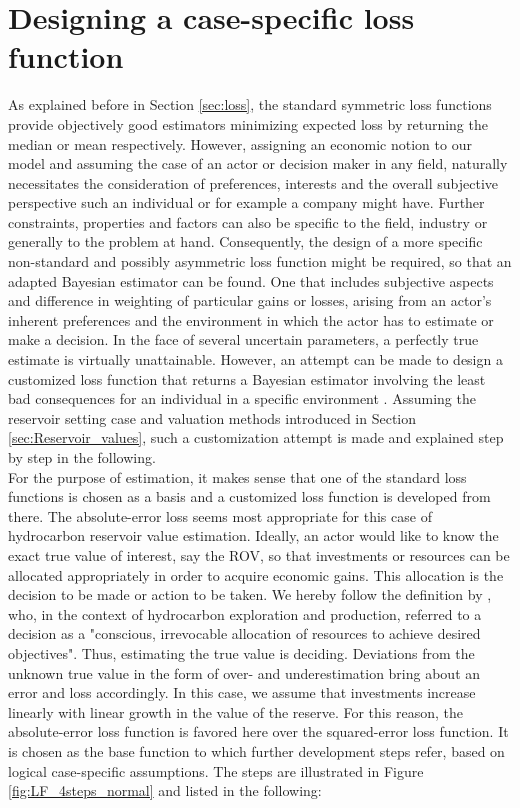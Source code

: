 		\section{Designing a case-specific loss function}\label{sec:LF_design}	
		As explained before in Section \ref{sec:loss}, the standard symmetric loss functions provide objectively good estimators minimizing expected loss by returning the median or mean respectively. However, assigning an economic notion to our model and assuming the case of an actor or decision maker in any field, naturally necessitates the consideration of preferences, interests and the overall subjective perspective such an individual or for example a company might have. Further constraints, properties and factors can also be specific to the field, industry or generally to the problem at hand. Consequently, the design of a more specific non-standard and possibly asymmetric loss function might be required, so that an adapted Bayesian estimator can be found. One that includes subjective aspects and difference in weighting of particular gains or losses, arising from an actor's inherent preferences and the environment in which the actor has to estimate or make a decision. In the face of several uncertain parameters, a perfectly true estimate is virtually unattainable. However, an attempt can be made to design a customized loss function that returns a Bayesian estimator involving the least bad consequences for an individual in a specific environment \citep{davidson2015, hennig2007}. Assuming the reservoir setting case and valuation methods introduced in Section \ref{sec:Reservoir_values}, such a customization attempt is made and explained step by step in the following.\\
		For the purpose of estimation, it makes sense that one of the standard loss functions is chosen as a basis and a customized loss function is developed from there. The absolute-error loss seems most appropriate for this case of hydrocarbon reservoir value estimation. Ideally, an actor would like to know the exact true value of interest, say the ROV, so that investments or resources can be allocated appropriately in order to acquire economic gains. This allocation is the decision to be made or action to be taken. We hereby follow the definition by \citet{bratvold2010making}, who, in the context of hydrocarbon exploration and production, referred to a decision as a "conscious, irrevocable allocation of resources to achieve desired objectives". Thus, estimating the true value is deciding. Deviations from the unknown true value in the form of over- and underestimation bring about an error and loss accordingly. In this case, we assume that investments increase linearly with linear growth in the value of the reserve. For this reason, the absolute-error loss function is favored here over the squared-error loss function. It is chosen as the base function to which further development steps refer, based on logical case-specific assumptions. The steps are illustrated in Figure \ref{fig:LF_4steps_normal} and listed in the following:
